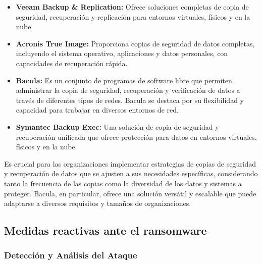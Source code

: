 \begin{itemize}
    \item \textbf{Veeam Backup \& Replication:} Ofrece soluciones completas de copia de seguridad, recuperación y replicación para entornos virtuales, físicos y en la nube.
    \item \textbf{Acronis True Image:} Proporciona copias de seguridad de datos completas, incluyendo el sistema operativo, aplicaciones y datos personales, con capacidades de recuperación rápida.
    \item \textbf{Bacula:} Es un conjunto de programas de software libre que permiten administrar la copia de seguridad, recuperación y verificación de datos a través de diferentes tipos de redes. Bacula se destaca por su flexibilidad y capacidad para trabajar en diversos entornos de red.
    \item \textbf{Symantec Backup Exec:} Una solución de copia de seguridad y recuperación unificada que ofrece protección para datos en entornos virtuales, físicos y en la nube.
\end{itemize}

Es crucial para las organizaciones implementar estrategias de copias de seguridad y recuperación de datos que se ajusten a sus necesidades específicas, considerando tanto la frecuencia de las copias como la diversidad de los datos y sistemas a proteger. Bacula, en particular, ofrece una solución versátil y escalable que puede adaptarse a diversos requisitos y tamaños de organizaciones.


























\subsection{Medidas reactivas ante el ransomware}



\subsubsection{Detección y Análisis del Ataque}

